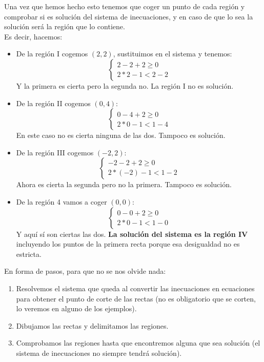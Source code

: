 \documentclass[a4paper,11pt,answers]{exam}
\begin{document}
Una vez que hemos hecho esto tenemos que coger un punto de cada región y comprobar si es solución
del sistema de inecuaciones, y en caso de que lo sea la solución será la región que lo contiene.\\
Es decir, hacemos:
\begin{itemize}
\item De la región I cogemos $(2, 2)$, sustituimos en el sistema y tenemos:
  \[
    \begin{cases}
      2-2 + 2 \geq 0\\
      2*2 - 1 < 2 - 2
    \end{cases}
  \]
  Y la primera es cierta pero la segunda no. La región I no es solución.
\item De la región II cogemos $(0, 4)$:
  \[
    \begin{cases}
      0-4 + 2 \geq 0\\
      2*0 -1 < 1 - 4
    \end{cases}
  \]
  En este caso no es cierta ninguna de las dos. Tampoco es solución.
\item De la región III cogemos $(-2, 2)$:
  \[
    \begin{cases}
      -2 - 2+ 2 \geq 0\\
      2*(-2) - 1 < 1-2
    \end{cases}
  \]
  Ahora es cierta la segunda pero no la primera. Tampoco es solución.
\item De la región 4 vamos a coger $(0,0)$:
  \[
    \begin{cases}
      0 - 0 + 2 \geq 0\\
      2*0 - 1 < 1 - 0
    \end{cases}
  \]
  Y aquí sí son ciertas las dos. \textbf{La solución del sistema es la región IV} incluyendo los puntos
  de la primera recta porque esa desigualdad no es estricta.
\end{itemize}

En forma de pasos, para que no se nos olvide nada:
\begin{enumerate}
\item Resolvemos el sistema que queda al convertir las inecuaciones en ecuaciones para obtener el
  punto de corte de las rectas (no es obligatorio que se corten, lo veremos en alguno de los ejemplos).
\item Dibujamos las rectas y delimitamos las regiones.
\item Comprobamos las regiones hasta que encontremos alguna que sea solución (el sistema de inecuaciones
  no siempre tendrá solución).
\end{enumerate}
\end{document}

